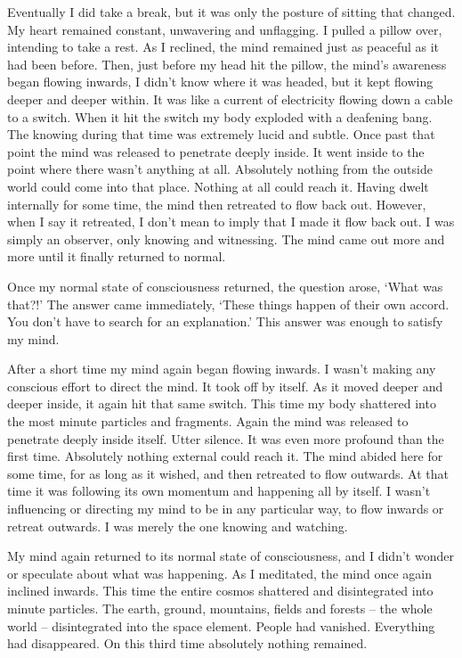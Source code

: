 Eventually I did take a break, but it was only the posture of sitting that changed. My heart remained constant, unwavering and unflagging. I pulled a pillow over, intending to take a rest. As I reclined, the mind remained just as peaceful as it had been before. Then, just before my head hit the pillow, the mind's awareness began flowing inwards, I didn't know where it was headed, but it kept flowing deeper and deeper within. It was like a current of electricity flowing down a cable to a switch. When it hit the switch my body exploded with a deafening bang. The knowing during that time was extremely lucid and subtle. Once past that point the mind was released to penetrate deeply inside. It went inside to the point where there wasn't anything at all. Absolutely nothing from the outside world could come into that place. Nothing at all could reach it. Having dwelt internally for some time, the mind then retreated to flow back out. However, when I say it retreated, I don't mean to imply that I made it flow back out. I was simply an observer, only knowing and witnessing. The mind came out more and more until it finally returned to normal.

Once my normal state of consciousness returned, the question arose, `What was that?!' The answer came immediately, `These things happen of their own accord. You don't have to search for an explanation.' This answer was enough to satisfy my mind.

After a short time my mind again began flowing inwards. I wasn't making any conscious effort to direct the mind. It took off by itself. As it moved deeper and deeper inside, it again hit that same switch. This time my body shattered into the most minute particles and fragments. Again the mind was released to penetrate deeply inside itself. Utter silence. It was even more profound than the first time. Absolutely nothing external could reach it. The mind abided here for some time, for as long as it wished, and then retreated to flow outwards. At that time it was following its own momentum and happening all by itself. I wasn't influencing or directing my mind to be in any particular way, to flow inwards or retreat outwards. I was merely the one knowing and watching.

My mind again returned to its normal state of consciousness, and I didn't wonder or speculate about what was happening. As I meditated, the mind once again inclined inwards. This time the entire cosmos shattered and disintegrated into minute particles. The earth, ground, mountains, fields and forests -- the whole world -- disintegrated into the space element. People had vanished. Everything had disappeared. On this third time absolutely nothing remained.


